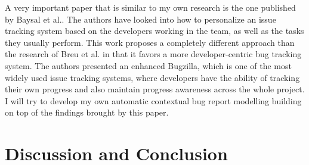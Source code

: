 \documentclass[11pt,english,twocolumn]{article}
\begin{document}
A very important paper that is similar to my own research is the one 
published by Baysal et al.\cite{baysal2013situational}. The authors
have looked into how to personalize an issue tracking system based on the
developers working in the team, as well as the tasks they usually perform.
This work proposes a completely different approach than the research of
Breu et al.\cite{breu2010information} in that it favors a more 
developer-centric bug tracking system. The authors presented an enhanced
Bugzilla, which is one of the most widely used issue tracking systems, where
developers have the ability of tracking their own progress and also maintain
progress awareness across the whole project. I will try to develop my
own automatic contextual bug report modelling building on top of the findings
brought by this paper.



\section{Discussion and Conclusion}
\label{sec:conclusion}




\let\oldbibliography\thebibliography
\renewcommand{\thebibliography}[1]{\oldbibliography{#1}
\setlength{\itemsep}{-3pt}}


{
\scriptsize

}
\end{document}
